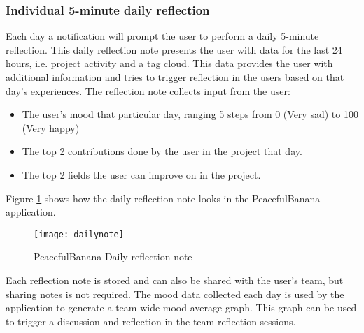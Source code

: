 \subsubsection{Individual 5-minute daily reflection}
Each day a notification will prompt the user to perform a daily 5-minute reflection. This daily reflection note presents the user with data for the last 24 hours, i.e. project activity and a tag cloud. This data provides the user with additional information and tries to trigger reflection in the users based on that day's experiences. The reflection note collects input from the user:
	\begin{itemize}
		\item The user's mood that particular day, ranging 5 steps from 0 (Very sad) to 100 (Very happy)
		\item The top 2 contributions done by the user in the project that day.
		\item The top 2 fields the user can improve on in the project.
	\end{itemize}
Figure \ref{dailynote2} shows how the daily reflection note looks in the PeacefulBanana application.
	\begin{figure}[!htpb]
		\centering
		\texttt{[image: dailynote]}
		\caption{PeacefulBanana Daily reflection note}
		\label{dailynote2}
	\end{figure}
Each reflection note is stored and can also be shared with the user's team, but sharing notes is not required. The mood data collected each day is used by the application to generate a team-wide mood-average graph. This graph can be used to trigger a discussion and reflection in the team reflection sessions. 
